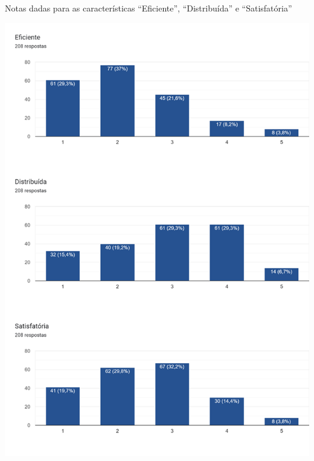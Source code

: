\begin{MyCenteredFigure}
  \caption{Notas dadas para as características ``Eficiente'', ``Distribuída'' e ``Satisfatória''}
  \label{fig:6.0-Opiniao-4_6}
  \includegraphics[width=\textwidth]{files/img/Forms/6.0-Opiniao-4_6}
\end{MyCenteredFigure}



